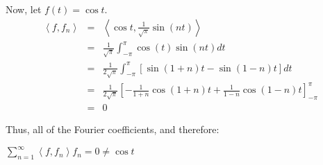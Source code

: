 \documentclass[letterpaper,12pt,fleqn]{article}
\newcommand{\inner}[1]{\left<#1\right>}
\begin{document}
Now, let $f(t)=\cos{t}$.
\begin{eqnarray*}
  \inner{f,f_n} &=& \inner{\cos{t},\frac{1}{\sqrt{\pi}}\sin(nt)} \\
  &=& \frac{1}{\sqrt{\pi}}\int_{-\pi}^{\pi}\cos(t)\sin(nt)dt \\
  &=& \frac{1}{2\sqrt{\pi}}\int_{-\pi}^{\pi}[\sin(1+n)t-\sin(1-n)t]dt \\
  &=& \frac{1}{2\sqrt{\pi}}\left[-\frac{1}{1+n}\cos(1+n)t+
    \frac{1}{1-n}\cos(1-n)t\right]_{-\pi}^{\pi} \\
  &=& 0
\end{eqnarray*}

Thus, all of the Fourier coefficients, and therefore:

$\sum_{n=1}^{\infty}\inner{f,f_n}f_n=0\ne\cos{t}$
\end{document}
